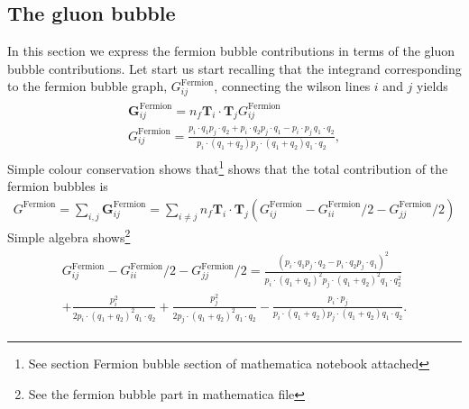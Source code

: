 \documentclass[a4paper,11pt]{article}
\numberwithin{equation}{section}
\newcommand{\ldot}{\!\cdot\!}
\newcommand{\bd}[1]{\mathbf{#1}}
\begin{document}
\subsection{The gluon bubble}
In this section we express the fermion bubble contributions in terms of the gluon bubble contributions. 
Let start us start recalling   that the integrand corresponding to the fermion bubble graph, $G^{\text{Fermion}}_{ij}$, connecting the wilson lines $i$ and $j$ yields 
\begin{align}
\begin{gathered}
\bd{G}^{\text{Fermion}}_{ij} =  n_f \bd{T}_{i}\cdot  \bd{T}_j  G_{ij}^{\text{Fermion}}\\
 G^{\text{Fermion}}_{ij} = \frac{ p_i\cdot q_1  p_j\cdot q_2 + p_i\cdot q_2  p_j\cdot q_1 - 
 p_i\cdot p_j \, q_1\cdot q_2 }{p_i\cdot (q_1+q_2) p_j\cdot (q_1+q_2)  q_1\cdot q_2}, 
 \end{gathered}
\end{align}
Simple colour conservation shows that\footnote{See section Fermion bubble section of mathematica notebook attached} shows that the total contribution of the fermion bubbles is 
\begin{align}
G^{\text{Fermion}} = \sum_{i,j}\bd{G}^{\text{Fermion}}_{ij}=  \sum_{i\ne j} n_f \bd{T}_i \cdot \bd{T}_j 
\left ( G^{\text{Fermion}}_{ij}-G^{\text{Fermion}}_{ii}/2-G^{\text{Fermion}}_{jj}/2\right)
\end{align}
Simple algebra shows\footnote{See the fermion bubble part in mathematica file}
\begin{align}
\begin{gathered}
G^{\text{Fermion}}_{ij}-G^{\text{Fermion}}_{ii}/2-G^{\text{Fermion}}_{jj}/2= \frac{(p_i\cdot q_1p_j\cdot q_2-p_i\cdot q_2p_j\cdot q_1 )^2}{p_i\ldot(q_1+q_2)^2p_j\ldot(q_1+q_2)^2 q_1\cdot q_2^2}\\
+ \frac{p_i^2}{2p_i\ldot(q_1+q_2)^2 q_1\cdot q_2}+  \frac{p_j^2}{2p_j\ldot(q_1+q_2)^2 q_1\cdot q_2}- 
 \frac{p_i\cdot p_j}{p_i\ldot(q_1+q_2) p_j\ldot(q_1+q_2) q_1\cdot q_2}. 
 \end{gathered}
\end{align}
\end{document}
